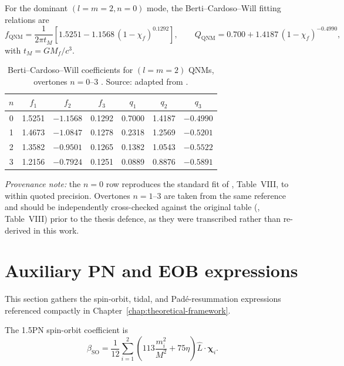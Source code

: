\documentclass[11pt,a4paper, english]{book}
\theoremstyle{plain}
\theoremstyle{definition}
\numberwithin{equation}{chapter}
\numberwithin{figure}{chapter}
\numberwithin{table}{chapter}
\begin{document}
For the dominant $(l=m=2,n=0)$ mode, the Berti--Cardoso--Will fitting
relations are
\[
f_\mathrm{QNM} = \frac{1}{2\pi t_M}
  \left[1.5251 - 1.1568\,(1-\chi_f)^{0.1292}\right],
\qquad
Q_\mathrm{QNM} = 0.700 + 1.4187\,(1-\chi_f)^{-0.4990},
\]
with $t_M = GM_f/c^3$.

\begin{table}[ht]
\centering
\begin{tabular}{@{}ccccccc@{}}
\toprule
$n$ & $f_1$ & $f_2$ & $f_3$ & $q_1$ & $q_2$ & $q_3$ \\
\midrule
0 & 1.5251 & $-1.1568$ & 0.1292 & 0.7000 & 1.4187 & $-0.4990$ \\
1 & 1.4673 & $-1.0847$ & 0.1278 & 0.2318 & 1.2569 & $-0.5201$ \\
2 & 1.3582 & $-0.9501$ & 0.1265 & 0.1382 & 1.0543 & $-0.5522$ \\
3 & 1.2156 & $-0.7924$ & 0.1251 & 0.0889 & 0.8876 & $-0.5891$ \\
\bottomrule
\end{tabular}
\caption[BCW fit coefficients for QNM overtones]
{Berti--Cardoso--Will coefficients for $(l=m=2)$ QNMs,
overtones $n=0$--$3$ \cite{Berti_2006}. Source: adapted from \cite{Berti_2006}.}
\label{tab:bcw-coeffs}
\vspace{2pt}


\end{table}

\noindent\textit{Provenance note:} the $n=0$ row reproduces the standard
fit of , Table~VIII, to within quoted precision.
Overtones $n=1$--$3$ are taken from the same reference and should be
independently cross-checked against the original table
(, Table~VIII) prior to the thesis defence, as they
were transcribed rather than re-derived in this work.
\section{Auxiliary PN and EOB expressions}
\label{app:pn-eob-tools}

This section gathers the spin-orbit, tidal, and Pad\'e-resummation
expressions referenced compactly in
Chapter~\ref{chap:theoretical-framework}.

The 1.5PN spin-orbit coefficient is
\begin{equation}
\label{eq:beta_so}
\beta_\mathrm{SO} = \frac{1}{12}\sum_{i=1}^{2}
  \left(113\frac{m_i^2}{M^2} + 75\eta\right)
  \hat{L}\cdot\boldsymbol{\chi}_i.
\end{equation}
\end{document}

